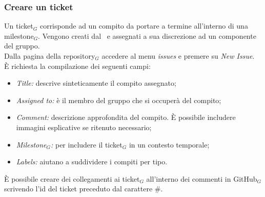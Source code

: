 \subsubsection{Creare un ticket}
Un ticket$_G$ corrisponde ad un compito da portare a termine all'interno di una milestone$_G$. Vengono creati dal \ruoloResponsabile\ e assegnati a sua discrezione ad un componente del gruppo. \\
Dalla pagina della repository$_G$ accedere al menu \textit{issues} e premere su \textit{New Issue}.\\
È richiesta la compilazione dei seguenti campi:
\begin{itemize}
    \item \textit{Title:} descrive sinteticamente il compito assegnato;
    \item \textit{Assigned to:} è il membro del gruppo che si occuperà del compito;
    \item \textit{Comment:} descrizione approfondita del compito. È possibile includere immagini esplicative se ritenuto necessario;
    \item \textit{Milestone$_G$:} per includere il ticket$_G$ in un contesto temporale;
    \item \textit{Labels:} aiutano a suddividere i compiti per tipo.
\end{itemize}
È possibile creare dei collegamenti ai ticket$_G$ all'interno dei commenti in GitHub$_G$ scrivendo l'id del ticket preceduto dal carattere \#.

